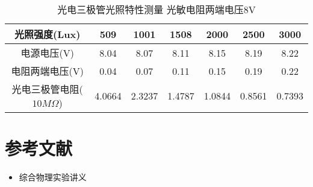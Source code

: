 \documentclass{ctexart}
\begin{document}
\begin{table}[H]
  \centering
  \begin{tabular}{|c|c|c|c|c|c|c|}
    \hline
    光照强度(Lux) &509&1001&1508&2000&2500&3000\\\hline
    电源电压(V) &8.04&8.07&8.11&8.15&8.19&8.22\\\hline
    电阻两端电压(V) &0.04&0.07&0.11&0.15&0.19&0.22\\\hline
    光电三极管电阻($10M\Omega$) &4.0664&2.3237&1.4787&1.0844&0.8561&0.7393 \\\hline
  \end{tabular}
  \caption{光电三极管光照特性测量 光敏电阻两端电压8V}
\end{table}

\section{参考文献}
\begin{itemize}[leftmargin=0pt]
  \item[] 综合物理实验讲义
\end{itemize}
\end{document}

